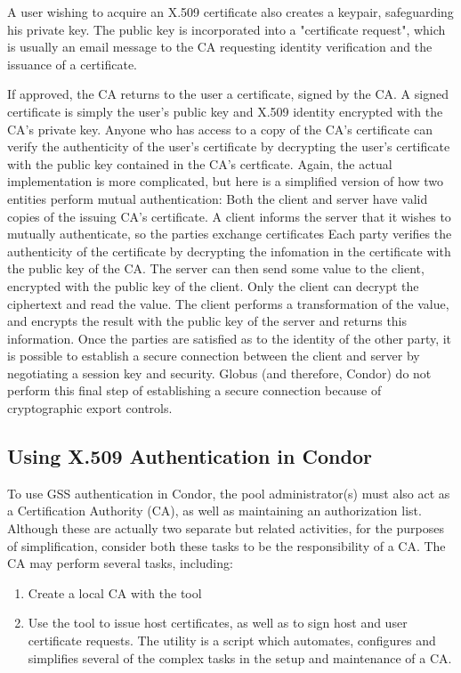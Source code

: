 A user wishing to acquire an X.509 certificate also creates a keypair, 
safeguarding his private key. The public key is incorporated into a 
"certificate request", which is usually an email message to the CA 
requesting identity verification and the issuance of a certificate.

If approved, the CA returns to the user a certificate, signed by the CA.
A signed certificate is simply the user's public key and X.509 identity
encrypted with the CA's private key. Anyone who has access to a copy of
the CA's certificate can verify the authenticity of the user's certificate 
by decrypting the user's certificate with the public key contained in the
CA's certficate. Again, the actual implementation is more complicated, but
here is a simplified version of how two entities perform mutual authentication:
Both the client and server have valid copies of the issuing CA's certificate.
A client informs the server that it wishes to mutually authenticate, so the
parties exchange certificates Each party verifies the authenticity of the
certificate by decrypting the infomation in the certificate with the public
key of the CA.
The server can then send some value to the client, encrypted with the public 
key of the client.  Only the client can decrypt the ciphertext and read the 
value. The client performs a transformation of the value, and encrypts the 
result with the public key of the server and returns this information. Once
the parties are satisfied as to the identity of the other party, it is possible
to establish a secure connection between the client and server by negotiating 
a session key and security. Globus (and therefore, Condor) do not perform
this final step of establishing a secure connection because of cryptographic 
export controls.

\subsection{\label{sec:Condor-X509-Authentication}Using X.509 Authentication
in Condor}

To use GSS authentication in Condor, the pool administrator(s) must also
act as a Certification Authority (CA), as well as maintaining an authorization
list. Although these are actually two separate but related activities, for
the purposes of simplification, consider both these tasks to be the 
responsibility of a CA. The CA may perform several tasks, including:
\begin{enumerate}
\item Create a local CA with the tool 
\item Use the tool  to issue host certificates, as well
as to sign host and user certificate requests. The  utility
is a script which automates, configures and simplifies several of the complex
tasks in the setup and maintenance of a CA. 
\end{enumerate}


